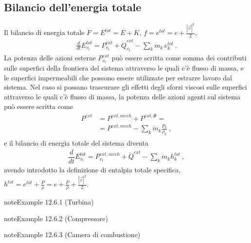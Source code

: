 \documentclass[letterpaper,10pt,italian]{jupyterBook}
\begin{document}
\subsection{Bilancio dell’energia totale}
\label{\detokenize{ch/thermodynamics/principles-open:bilancio-dell-energia-totale}}
\sphinxAtStartPar
Il bilancio di energia totale \(F = E^{tot} = E + K\), \(f = e^{tot} = e + \frac{|\vec{v}|^2}{2}\),
\begin{equation*}
\begin{split}\frac{d}{dt} E^{tot}_{v_t} = P^{ext}_{v_t}  + \dot{Q}^{ext}_{v_t}  - \sum_k \dot{m}_k \, e^{tot}_k \ .\end{split}
\end{equation*}
\sphinxAtStartPar
La potenza delle azioni esterne \(P^{ext}_{v_t}\) può essere scritta come somma dei contributi sulle superfici della frontiera del sistema attraverso le quali c’è flusso di massa, e le superfici impermeabili che possono essere utilizzate per estrarre lavoro dal sistema. Nel caso si possano trascurare gli effetti degli sforzi viscosi sulle superfici attraverso le quali c’è flusso di massa, la potenza delle azioni agenti sul sistema può essere scritta come
\begin{equation*}
\begin{split}\begin{aligned}
  P^{ext} & = P^{ext,mech} + P^{ext,\Phi} = \\
          & = P^{ext,mech} - \sum_{k} \dot{m}_k \frac{P_k}{\rho_k} \ , 
\end{aligned}\end{split}
\end{equation*}
\sphinxAtStartPar
e il bilancio di energia totale del sistema diventa
\begin{equation*}
\begin{split}\dfrac{d}{dt} E^{tot}_{v_t} = P^{ext,mech}_{v_t} + \dot{Q}^{ext} - \sum_k \dot{m}_k h^{tot}_k \ ,\end{split}
\end{equation*}
\sphinxAtStartPar
avendo introdotto la definizione di entalpia totale specifica, \(h^{tot} = e^{tot} + \frac{P}{\rho} = e + \frac{P}{\rho} + \frac{|\vec{v}|^2}{2}\).
\label{ch/thermodynamics/principles-open:example-0}
\begin{sphinxadmonition}{note}{Example 12.6.1 (Turbina)}


\end{sphinxadmonition}
\label{ch/thermodynamics/principles-open:example-1}
\begin{sphinxadmonition}{note}{Example 12.6.2 (Compressore)}


\end{sphinxadmonition}
\label{ch/thermodynamics/principles-open:example-2}
\begin{sphinxadmonition}{note}{Example 12.6.3 (Camera di combustione)}


\end{sphinxadmonition}
\end{document}
